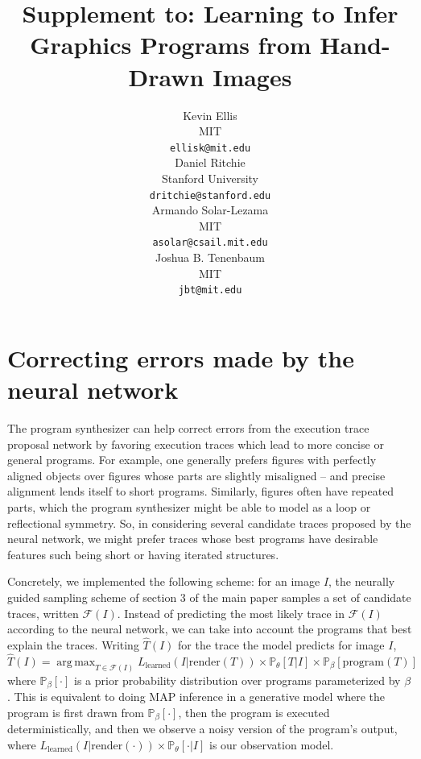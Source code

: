 \documentclass{article}
\title{Supplement to: Learning to Infer Graphics Programs from Hand-Drawn Images}
\author{
Kevin Ellis\\
  MIT\\
  \texttt{ellisk@mit.edu} \\
  \And
  Daniel Ritchie\\
Stanford University\\
 \texttt{dritchie@stanford.edu} \\
 \And
 Armando Solar-Lezama\\
 MIT\\
\texttt{asolar@csail.mit.edu} \\
\And
Joshua B. Tenenbaum \\
MIT\\
\texttt{jbt@mit.edu}
}
\DeclareMathOperator*{\argmax}{arg\,max} %
\newcommand{\probability}{\mathds{P}} %
\begin{document}

\maketitle

\section{Correcting errors made by the neural network}\label{synthesizerHelpsParsing}
The program synthesizer can help correct errors from the execution trace proposal network by favoring execution traces which lead to more concise or general programs.
For example, one generally prefers figures with perfectly aligned objects over figures whose parts are slightly misaligned -- and precise alignment lends itself to short programs.
Similarly, figures often have repeated parts,
which the program synthesizer might be able to model as a loop or reflectional symmetry.
So, in considering several candidate traces proposed by the neural network,
we might prefer traces whose best programs have desirable features such being short or having iterated structures.

Concretely, we implemented the following scheme: for an image $I$, the neurally guided sampling scheme of section 3 of the main paper samples a set of candidate traces, written $\mathcal{F}(I)$.
Instead of predicting the most likely trace in $\mathcal{F}(I)$ according to the neural network,
we can take into account the programs that best explain the traces. 
Writing $\hat{T}(I)$ for the trace the model predicts for image $I$,
\begin{equation}
\hat{T}(I) = \argmax_{T\in \mathcal{F}(I)} L_{\text{learned}}(I | \text{render}(T))\times \probability_\theta[T|I] \times\probability_{\beta} [ \text{program}(T)] 
\end{equation}
where $\probability_{\beta} [\cdot]$ is a prior probability
distribution over programs parameterized by $\beta$.
This is equivalent to doing
MAP inference in a generative model where the program is first drawn
from $\probability_{\beta} [\cdot]$, then the program is executed deterministically,
and then we observe a noisy version of the program's output, where $L_\text{learned}(I|\text{render}(\cdot))\times\probability_\theta[\cdot|I]$
is our observation model.
\end{document}
